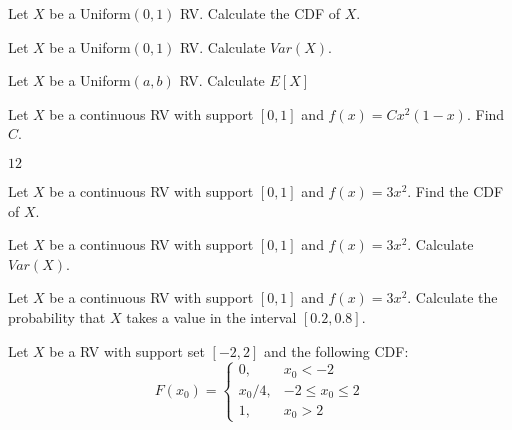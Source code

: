 \documentclass[addpoints,12pt]{exam}
\begin{document}
\begin{questions}

\question Let $X$ be a Uniform$(0,1)$ RV. Calculate the CDF of $X$.

\question Let $X$ be a Uniform$(0,1)$ RV. Calculate $Var(X)$.

\question Let $X$ be a Uniform$(a,b)$ RV. Calculate $E[X]$

\question Let $X$ be a continuous RV with support $[0,1]$ and $f(x) = C x^2(1 - x)$. Find $C$.
\begin{solution}
  $12$
\end{solution}

\question Let $X$ be a continuous RV with support $[0,1]$ and $f(x) = 3x^2$. Find the CDF of $X$.

\question Let $X$ be a continuous RV with support $[0,1]$ and $f(x) = 3x^2$. Calculate $Var(X)$.

\question Let $X$ be a continuous RV with support $[0,1]$ and $f(x) = 3x^2$. Calculate the probability that $X$ takes a value in the interval $[0.2, 0.8]$.

\question Let $X$ be a RV with support set $[-2,2]$ and the following CDF:
\[
  F(x_0) = \left\{
  \begin{array}{rr}
    0, & x_0 < -2\\
    x_0/4, & -2 \leq x_0 \leq 2\\
    1, & x_0 > 2
  \end{array}
  \right.
\]




\end{questions}
\end{document}
